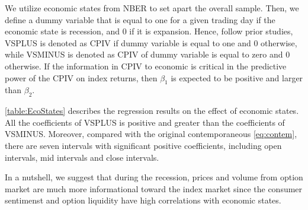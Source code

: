 We utilize economic states from NBER to set apart the overall sample. Then, we define a dummy variable that is equal to one for a given trading day if the economic state is recession, and 0 if it is expansion. Hence, follow prior studies, VSPLUS is denoted as CPIV if dummy variable is equal to one and 0 otherwise, while VSMINUS is denoted as CPIV of dummy variable is equal to zero and 0 otherwise. If the information in CPIV to economic is critical in the predictive power of the CPIV on index returns, then $\beta _{1}$ is expected to be positive and larger than $\beta _{2}$.

\autoref{table:EcoStates} describes the regression results on the effect of economic states. All the coefficients of VSPLUS is positive and greater than the coefficients of VSMINUS. Moreover, compared with the original contemporaneous \autoref{eq:contem}, there are seven intervals with significant positive coefficients, including open intervals, mid intervals and close intervals. 

In a nutshell, we suggest that during the recession, prices and volume from option market are much more informational toward the index market since the consumer sentimenst and option liquidity have high correlations with economic states. 















